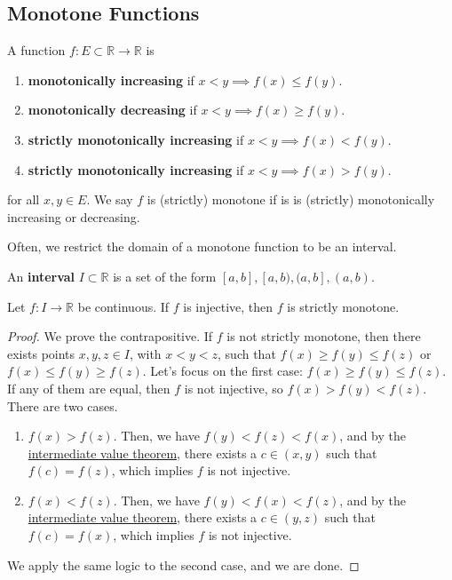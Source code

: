 \subsection{Monotone Functions} 

	\begin{definition}[Monotone]
	  \label{def:monotone}
		A function $f: E \subset \mathbb{R} \to \mathbb{R}$ is 
		\begin{enumerate}
			\item \textbf{monotonically increasing} if $x < y \implies f(x) \leq f(y)$. 
			\item \textbf{monotonically decreasing} if $x < y \implies f(x) \geq f(y)$. 
		  \item \textbf{strictly monotonically increasing} if $x < y \implies f(x) < f(y)$. 
		  \item \textbf{strictly monotonically increasing} if $x < y \implies f(x) > f(y)$. 
		\end{enumerate}
		for all $x, y \in E$. We say $f$ is (strictly) monotone if is is (strictly) monotonically increasing or decreasing. 
	\end{definition}

	Often, we restrict the domain of a monotone function to be an interval. 

	\begin{definition}[Interval]
	  \label{def:interval}
		An \textbf{interval} $I \subset \mathbb{R}$ is a set of the form $[a, b], [a, b), (a, b], (a, b)$. 
	\end{definition}

	\begin{theorem}
		\label{thm:cont_inj_monotone}
		Let $f: I \to \mathbb{R}$ be continuous. If $f$ is injective, then $f$ is strictly monotone. 
	\end{theorem}
	\begin{proof}
		We prove the contrapositive. If $f$ is not strictly monotone, then there exists points $x, y, z \in I$, with $x < y < z$, such that $f(x) \geq f(y) \leq f(z)$ or $f(x) \leq f(y) \geq f(z)$. Let's focus on the first case: $f(x) \geq f(y) \leq f(z)$. If any of them are equal, then $f$ is not injective, so $f(x) > f(y) < f(z)$. There are two cases. 
		\begin{enumerate}
		  \item $f(x) > f(z)$. Then, we have $f(y) < f(z) < f(x)$, and by the \hyperref[thm:intermediate-value-theorem]{intermediate value theorem}, there exists a $c \in (x, y)$ such that $f(c) = f(z)$, which implies $f$ is not injective. 
			\item $f(x) < f(z)$. Then, we have $f(y) < f(x) < f(z)$, and by the \hyperref[thm:intermediate-value-theorem]{intermediate value theorem}, there exists a $c \in (y, z)$ such that $f(c) = f(x)$, which implies $f$ is not injective. 
		\end{enumerate}
		We apply the same logic to the second case, and we are done. 
	\end{proof}

